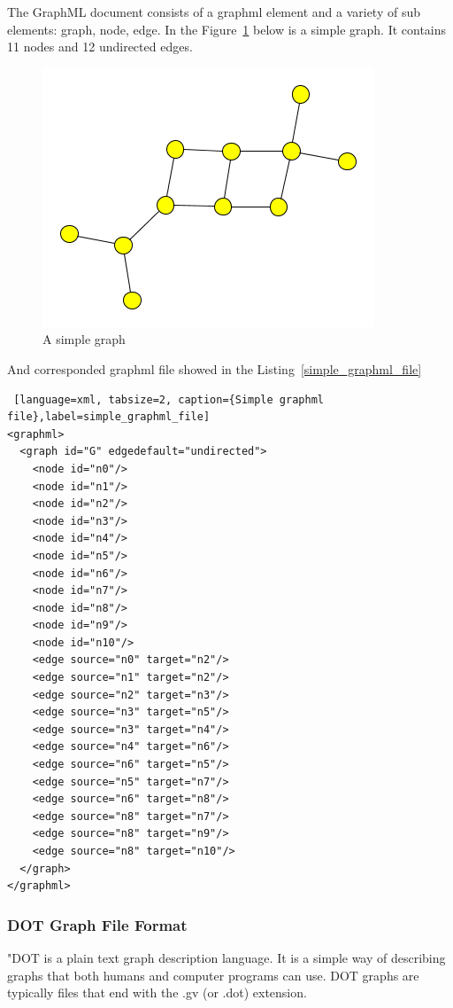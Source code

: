 The GraphML document consists of a graphml element and a variety of sub elements: graph, node, edge. In the Figure~\ref{fig:simple_graphml} below is a simple graph. It contains 11 nodes and 12 undirected edges.

\begin{figure}[h!]
\centering
\includegraphics[scale=1.0]{pictures/simple.png}
\caption{A simple graph}
\label{fig:simple_graphml}
\end{figure}


And corresponded graphml file showed in the Listing~\ref{simple_graphml_file}

\begin{center}
\begin{lstlisting} [language=xml, tabsize=2, caption={Simple graphml file},label=simple_graphml_file]
<graphml>
  <graph id="G" edgedefault="undirected">
    <node id="n0"/>
    <node id="n1"/>
    <node id="n2"/>
    <node id="n3"/>
    <node id="n4"/>
    <node id="n5"/>
    <node id="n6"/>
    <node id="n7"/>
    <node id="n8"/>
    <node id="n9"/>
    <node id="n10"/>
    <edge source="n0" target="n2"/>
    <edge source="n1" target="n2"/>
    <edge source="n2" target="n3"/>
    <edge source="n3" target="n5"/>
    <edge source="n3" target="n4"/>
    <edge source="n4" target="n6"/>
    <edge source="n6" target="n5"/>
    <edge source="n5" target="n7"/>
    <edge source="n6" target="n8"/>
    <edge source="n8" target="n7"/>
    <edge source="n8" target="n9"/>
    <edge source="n8" target="n10"/>
  </graph>
</graphml>
\end{lstlisting}
\end{center}

\subsubsection{DOT Graph File Format}
"DOT is a plain text graph description language. It is a simple way of describing graphs that both humans and computer programs can use. DOT graphs are typically files that end with the .gv (or .dot) extension.


